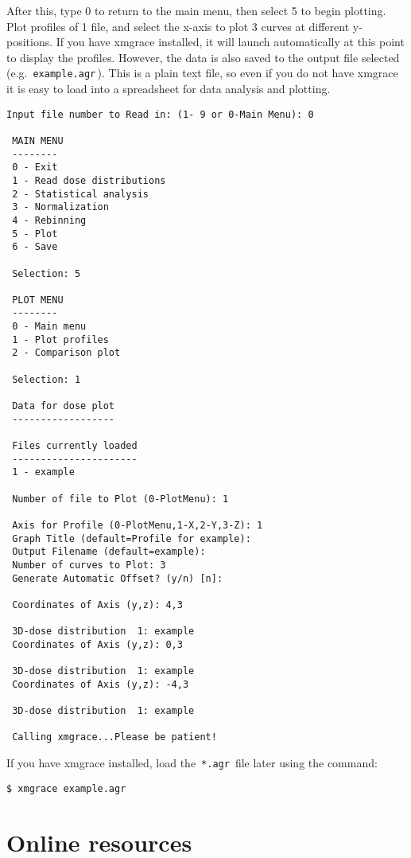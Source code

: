 \documentclass[12pt,twoside]{article}
\begin{document}
After this, type 0 to return to the main menu, then select 5 to begin plotting. Plot profiles of 1 file, and select the x-axis to plot 3 curves at different y-positions. If you have xmgrace installed, it will launch automatically at this point to display the profiles. However, the data is also saved to the output file selected (e.g. \,\Verb|example.agr|\,). This is a plain text file, so even if you do not have xmgrace it is easy to load into a spreadsheet for data analysis and plotting.

{\scriptsize
\begin{lstlisting}[language={},backgroundcolor=\color{white}]
 Input file number to Read in: (1- 9 or 0-Main Menu): 0

 MAIN MENU
 --------
 0 - Exit
 1 - Read dose distributions
 2 - Statistical analysis
 3 - Normalization
 4 - Rebinning
 5 - Plot
 6 - Save

 Selection: 5

 PLOT MENU
 --------
 0 - Main menu
 1 - Plot profiles
 2 - Comparison plot

 Selection: 1

 Data for dose plot
 ------------------

 Files currently loaded
 ----------------------
 1 - example

 Number of file to Plot (0-PlotMenu): 1

 Axis for Profile (0-PlotMenu,1-X,2-Y,3-Z): 1
 Graph Title (default=Profile for example):
 Output Filename (default=example):
 Number of curves to Plot: 3
 Generate Automatic Offset? (y/n) [n]:

 Coordinates of Axis (y,z): 4,3

 3D-dose distribution  1: example
 Coordinates of Axis (y,z): 0,3

 3D-dose distribution  1: example
 Coordinates of Axis (y,z): -4,3

 3D-dose distribution  1: example

 Calling xmgrace...Please be patient!
\end{lstlisting}
}

If you have xmgrace installed, load the \,\Verb|*.agr|\, file later using the command:

\begin{lstlisting}
$ xmgrace example.agr
\end{lstlisting}

\clearpage
\section{Online resources}
\end{document}
